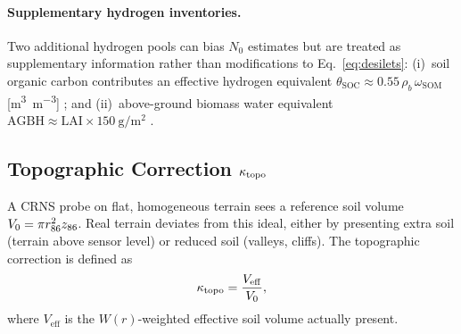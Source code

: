 \paragraph{Supplementary hydrogen inventories.}
Two additional hydrogen pools can bias $N_0$ estimates but are treated
as supplementary information rather than modifications to
Eq.~\eqref{eq:desilets}:
(i)~soil organic carbon contributes an effective hydrogen equivalent
$\theta_\mathrm{SOC} \approx 0.55\,\rho_b\,\omega_\mathrm{SOM}$
[\si{\cubic\metre\per\cubic\metre}] \citep{bogena2017}; and
(ii)~above-ground biomass water equivalent
$\mathrm{AGBH} \approx \mathrm{LAI} \times
\SI{150}{\gram\per\metre\squared}$
\citep{baatz2015, schron2017}.

\subsection{Topographic Correction \texorpdfstring{$\kappa_\mathrm{topo}$}{kappa\_topo}}
\label{sec:kappa_topo}

A CRNS probe on flat, homogeneous terrain sees a reference soil volume
$V_0 = \pi r_{86}^2 z_{86}$.
Real terrain deviates from this ideal, either by presenting extra soil
(terrain above sensor level) or reduced soil (valleys, cliffs).
The topographic correction is defined as
\begin{equation}
  \kappa_\mathrm{topo} = \frac{V_\mathrm{eff}}{V_0},
  \label{eq:kappa_topo_def}
\end{equation}
where $V_\mathrm{eff}$ is the $W(r)$-weighted effective soil volume
actually present.

